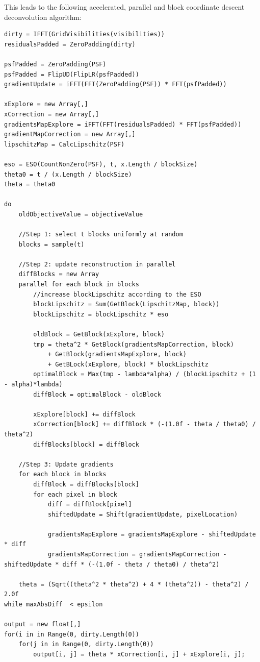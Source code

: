 This leads to the following accelerated, parallel and block coordinate descent deconvolution algorithm:
\begin{lstlisting}
dirty = IFFT(GridVisibilities(visibilities))
residualsPadded = ZeroPadding(dirty)

psfPadded = ZeroPadding(PSF)
psfPadded = FlipUD(FlipLR(psfPadded))
gradientUpdate = iFFT(FFT(ZeroPadding(PSF)) * FFT(psfPadded))

xExplore = new Array[,]
xCorrection = new Array[,]
gradientsMapExplore = iFFT(FFT(residualsPadded) * FFT(psfPadded))
gradientMapCorrection = new Array[,]
lipschitzMap = CalcLipschitz(PSF)

eso = ESO(CountNonZero(PSF), t, x.Length / blockSize)
theta0 = t / (x.Length / blockSize)
theta = theta0

do 
	oldObjectiveValue = objectiveValue
	
	//Step 1: select t blocks uniformly at random
	blocks = sample(t)
	
	//Step 2: update reconstruction in parallel
	diffBlocks = new Array
	parallel for each block in blocks
		//increase blockLipschitz according to the ESO
		blockLipschitz = Sum(GetBlock(LipschitzMap, block))
		blockLipschitz = blockLipschitz * eso
		
		oldBlock = GetBlock(xExplore, block)
		tmp = theta^2 * GetBlock(gradientsMapCorrection, block) 
			+ GetBlock(gradientsMapExplore, block) 
			+ GetBLock(xExplore, block) * blockLipschitz
		optimalBlock = Max(tmp - lambda*alpha) / (blockLipschitz + (1 - alpha)*lambda)
		diffBlock = optimalBlock - oldBlock
		
		xExplore[block] += diffBlock
		xCorrection[block] += diffBlock * (-(1.0f - theta / theta0) / theta^2)
		diffBlocks[block] = diffBlock
	
	//Step 3: Update gradients
	for each block in blocks
		diffBlock = diffBlocks[block]
		for each pixel in block
			diff = diffBlock[pixel]
			shiftedUpdate = Shift(gradientUpdate, pixelLocation)
			
			gradientsMapExplore = gradientsMapExplore - shiftedUpdate * diff
			gradientsMapCorrection = gradientsMapCorrection - shiftedUpdate * diff * (-(1.0f - theta / theta0) / theta^2)
	
	theta = (Sqrt((theta^2 * theta^2) + 4 * (theta^2)) - theta^2) / 2.0f
while maxAbsDiff  < epsilon

output = new float[,]
for(i in in Range(0, dirty.Length(0))
	for(j in in Range(0, dirty.Length(0))
		output[i, j] = theta * xCorrection[i, j] + xExplore[i, j];
\end{lstlisting}

